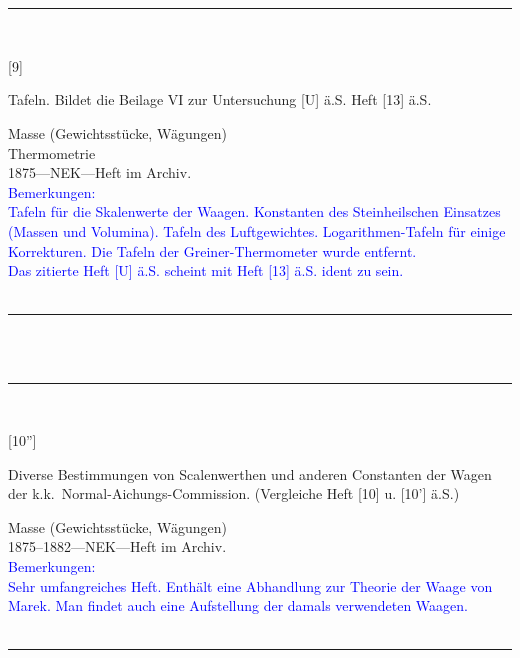 \\
\vspace*{-2.5pt}\\
\parbox{\textwidth}{%
\rule{\textwidth}{1pt}\vspace*{-3mm}\\
\begin{minipage}[t]{0.1\textwidth}\vspace{0pt}
\Huge\rule[-4mm]{0cm}{1cm}[9]
\end{minipage}
\hfill
\begin{minipage}[t]{0.9\textwidth}\vspace{0pt}
\large Tafeln. Bildet die Beilage VI zur Untersuchung [U] ä.S. Heft [13] ä.S.\rule[-2mm]{0mm}{2mm}
\end{minipage}
{\footnotesize\flushright
Masse (Gewichtsstücke, Wägungen)\\
Thermometrie\\
}
1875\quad---\quad NEK\quad---\quad Heft im Archiv.\\
\textcolor{blue}{Bemerkungen:\\{}
Tafeln für die Skalenwerte der Waagen. Konstanten des Steinheilschen Einsatzes (Massen und Volumina). Tafeln des Luftgewichtes. Logarithmen-Tafeln für einige Korrekturen. Die Tafeln der Greiner-Thermometer wurde entfernt.\\{}
Das zitierte Heft [U] ä.S. scheint mit Heft [13] ä.S. ident zu sein.\\{}
}
\\[-15pt]
\rule{\textwidth}{1pt}
}
\\
\vspace*{-2.5pt}\\
\parbox{\textwidth}{%
\rule{\textwidth}{1pt}\vspace*{-3mm}\\
\begin{minipage}[t]{0.22\textwidth}\vspace{0pt}
\Huge\rule[-4mm]{0cm}{1cm}[10'']
\end{minipage}
\hfill
\begin{minipage}[t]{0.78\textwidth}\vspace{0pt}
\large Diverse Bestimmungen von Scalenwerthen und anderen Constanten der Wagen der k.k.\ Normal-Aichungs-Commission. (Vergleiche Heft [10] u. [10'] ä.S.)\rule[-2mm]{0mm}{2mm}
\end{minipage}
{\footnotesize\flushright
Masse (Gewichtsstücke, Wägungen)\\
}
1875--1882\quad---\quad NEK\quad---\quad Heft im Archiv.\\
\textcolor{blue}{Bemerkungen:\\{}
Sehr umfangreiches Heft. Enthält eine Abhandlung zur Theorie der Waage von Marek. Man findet auch eine Aufstellung der damals verwendeten Waagen.\\{}
}
\\[-15pt]
\rule{\textwidth}{1pt}
}
